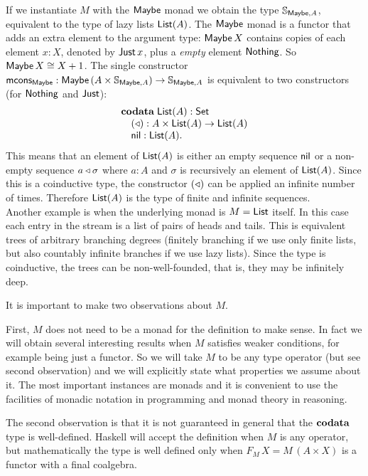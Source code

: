 If we instantiate $M$ with the $\mathsf{Maybe}$ monad we obtain the type $\mathbb{S}_{\mathsf{Maybe},A}$, equivalent to the type of lazy lists $\mathsf{List}(A)$.
The $\mathsf{Maybe}$ monad is a functor that adds an extra element to the argument type:
$\mathsf{Maybe}\,X$ contains copies of each element $x:X$, denoted by $\mathsf{Just}\,x$, plus a {\em empty} element $\mathsf{Nothing}$.
So $\mathsf{Maybe}\,X \cong X+1$.
The single constructor $\mathsf{mcons}_{\mathsf{Maybe}}: \mathsf{Maybe}\,(A\times \mathbb{S}_{\mathsf{Maybe},A})\rightarrow\mathbb{S}_{\mathsf{Maybe},A}$ is equivalent to two constructors (for $\mathsf{Nothing}$ and $\mathsf{Just}$):
$$
\begin{array}[t]{l}
\mathbf{codata}\;
\mathsf{List}(A):\mathsf{Set}\\
\quad (\triangleleft): A\times \mathsf{List}(A)\rightarrow\mathsf{List}(A)\\
\quad \mathsf{nil}: \mathsf{List}(A).
\end{array}
$$
This means that an element of $\mathsf{List}(A)$ is either an empty sequence $\mathsf{nil}$ or a non-empty sequence $a\triangleleft \sigma$ where $a:A$ and $\sigma$ is recursively an element of $\mathsf{List}(A)$.
Since this is a coinductive type, the constructor $(\triangleleft)$ can be applied an infinite number of times.
Therefore $\mathsf{List}(A)$ is the type of finite and infinite sequences. \\

Another example is when the underlying monad is $M = \mathsf{List} $ itself.
In this case each entry in the stream is a list of pairs of heads and tails.
This is equivalent trees of arbitrary branching degrees (finitely branching if we use only finite lists, but also countably infinite branches if we use lazy lists).
Since the type is coinductive, the trees can be non-well-founded, that is, they may be infinitely deep.


It is important to make two observations about $M$.

First, $M$ does not need to be a monad for the definition to make sense. 
In fact we will obtain several interesting results when $M$ satisfies weaker conditions, for example being just a functor.
So we will take $M$ to be any type operator (but see second observation) and we will explicitly state what properties we assume about it.
The most important instances are monads and it is convenient to use the facilities of monadic notation in programming and monad theory in reasoning.

The second observation is that it is not guaranteed in general that the $\mathbf{codata}$ type is well-defined.
Haskell will accept the definition when $M$ is any operator, but mathematically the type is well defined only when $F_M\,X = M\,(A\times X)$ is a functor with a final coalgebra.

